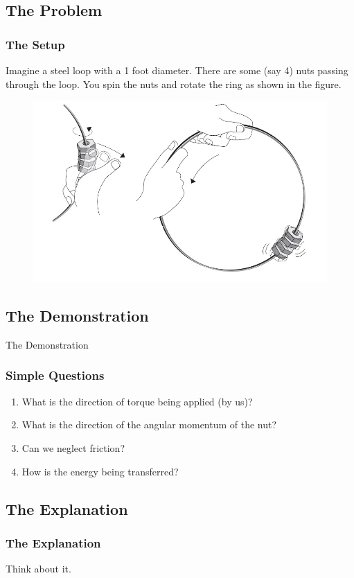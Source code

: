 \documentclass{beamer}
\begin{document}
	\subsection{The Problem}
		\begin{frame}
		\frametitle{The Setup}
			Imagine a steel loop with a 1 foot diameter. There are some (say 4) nuts passing through the loop. You spin the nuts and rotate the ring as shown in the figure.
			\begin{figure}
			\includegraphics[width=0.8\linewidth]{images/nutspinner}
			\end{figure}
		\end{frame}

	\subsection{The Demonstration}
		\begin{frame}
			\Large{\centerline{The Demonstration}}
		\end{frame}

		\begin{frame}
		\frametitle{Simple Questions}
			\begin{enumerate}			
				\item What is the direction of torque being applied (by us)?
				\item What is the direction of the angular momentum of the nut?
				\item Can we neglect friction?
				\item How is the energy being transferred?
			\end{enumerate}
		\end{frame}

	\subsection{The Explanation}
		\begin{frame}
		\frametitle{The Explanation}
			Think about it.
		\end{frame}
\end{document}
